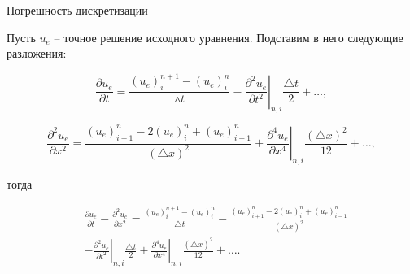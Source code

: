 \documentclass[10pt,xcolor=pst,aspectratio=169]{beamer}
\begin{document}
\begin{frame}{Погрешность дискретизации}

    \transdissolve[duration=0.1]
    \justifying
    \large

    Пусть $u_{e}$ -- точное решение исходного уравнения. Подставим в него следующие разложения:

    \[
        \frac{\partial u_{e}}{\partial t} = \frac{\left( u_{e} \right)^{n + 1}_{i} - \left( u_{e} \right)^{n}_{i}}{\vartriangle t} - \left. \frac{\partial^{2} u_{e}}{\partial t^{2}} \right|_{n, i} \frac{\triangle t}{2} + \ldots ,
    \]

    \[
        \frac{\partial^{2} u_{e}}{\partial x^{2}} = \frac{\left( u_{e} \right)^{n}_{i + 1} - 2 \left( u_{e} \right)^{n}_{i} + \left( u_{e} \right)^{n}_{i - 1}}{\left( \triangle x \right)^{2}} + \left. \frac{\partial^{4} u_{e}}{\partial x^{4}} \right|_{n, i} \frac{\left( \triangle x \right)^{2}}{12} + \ldots ,
    \]

    тогда

    \[
        \begin{split}
            &\frac{\partial u_{e}}{\partial t} - \frac{\partial^{2} u_{e}}{\partial x^{2}} = \frac{\left( u_{e} \right)^{n + 1}_{i} - \left( u_{e} \right)^{n}_{i}}{\triangle t} - \frac{\left( u_{e} \right)^{n}_{i + 1} - 2 \left( u_{e} \right)^{n}_{i} + \left( u_{e} \right)^{n}_{i - 1}}{\left(\triangle x\right)^{2}} \\
            &- \left. \frac{\partial^{2} u_{e}}{\partial t^{2}} \right|_{n, i} \frac{\triangle t}{2} + \left. \frac{\partial^{4} u_{e}}{\partial x^{4}} \right|_{n, i} \frac{\left( \triangle x \right)^{2}}{12} + \ldots.
        \end{split}
    \]

\end{frame}

%
%
%
%
%
% 
\end{document}
